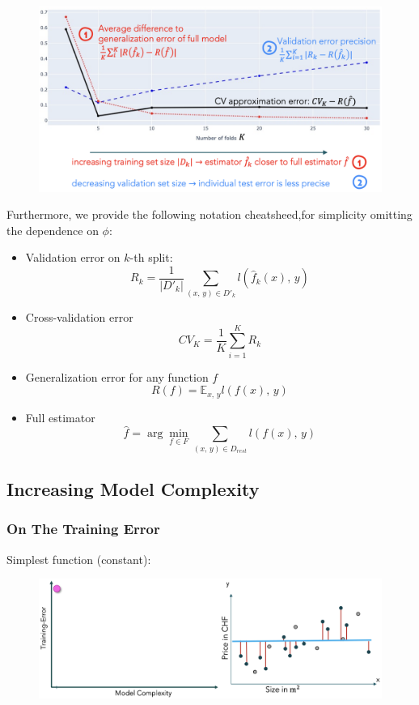 \documentclass[a4paper]{extarticle}
\begin{document}
\begin{figure}[H]
    \includegraphics[width=15cm]{../images/IntroML_Fig3-5}
    \centering
\end{figure}

Furthermore, we provide the following notation cheatsheed,for simplicity omitting the dependence on \(\phi\):

\begin{itemize}
    \item Validation error on \(k\)-th split:
    \[R_k = \frac{1}{|D'_k|} \sum_{(x, \, y) \in D'_k}l(\hat{f}_k(x), \, y)\]
    \item Cross-validation error
    \[CV_K = \frac{1}{K} \sum_{i = 1}^K R_k\]
    \item Generalization error for any function \(f\)
    \[R(f) = \mathbb{E}_{x, \, y} l(f(x), \, y)\]
    \item Full estimator
    \[\hat{f} = \arg \min_{f \in F} \sum_{(x, \, y) \in D_{rest}} l(f(x), \, y)\]
\end{itemize}

\subsection{Increasing Model Complexity}

\subsubsection{On The Training Error}

Simplest function (constant):

\begin{figure}[H]
    \includegraphics[width=15cm]{../images/IntroML_Fig3-6}
    \centering
\end{figure}
\end{document}
